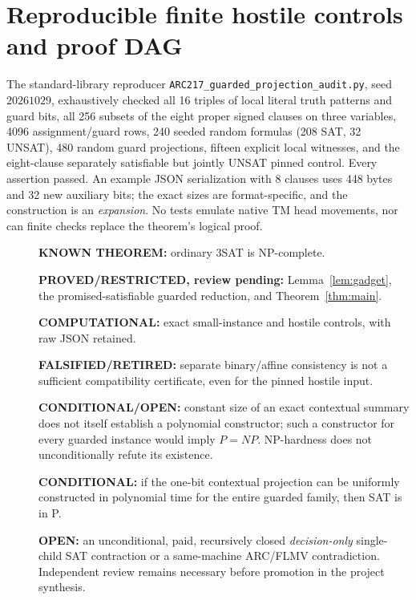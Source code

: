 \documentclass[11pt]{article}
\begin{document}
\section{Reproducible finite hostile controls and proof DAG}
The standard-library reproducer \texttt{ARC217\_guarded\_projection\_audit.py}, seed $20261029$, exhaustively checked all 16 triples of local literal truth patterns and guard bits, all 256 subsets of the eight proper signed clauses on three variables, 4096 assignment/guard rows, 240 seeded random formulas (208 SAT, 32 UNSAT), 480 random guard projections, fifteen explicit local witnesses, and the eight-clause separately satisfiable but jointly UNSAT pinned control. Every assertion passed. An example JSON serialization with 8 clauses uses 448 bytes and 32 new auxiliary bits; the exact sizes are format-specific, and the construction is an \emph{expansion}. No tests emulate native TM head movements, nor can finite checks replace the theorem's logical proof.

\begin{description}
\item[]\textbf{KNOWN THEOREM:} ordinary $3$SAT is NP-complete.
\item[]\textbf{PROVED/RESTRICTED, review pending:} Lemma~\ref{lem:gadget}, the promised-satisfiable guarded reduction, and Theorem~\ref{thm:main}.
\item[]\textbf{COMPUTATIONAL:} exact small-instance and hostile controls, with raw JSON retained.
\item[]\textbf{FALSIFIED/RETIRED:} separate binary/affine consistency is not a sufficient compatibility certificate, even for the pinned hostile input.
\item[]\textbf{CONDITIONAL/OPEN:} constant size of an exact contextual summary does not itself establish a polynomial constructor; such a constructor for every guarded instance would imply $P=NP$. NP-hardness does not unconditionally refute its existence.
\item[]\textbf{CONDITIONAL:} if the one-bit contextual projection can be uniformly constructed in polynomial time for the entire guarded family, then SAT is in P.
\item[]\textbf{OPEN:} an unconditional, paid, recursively closed \emph{decision-only} single-child SAT contraction or a same-machine ARC/FLMV contradiction. Independent review remains necessary before promotion in the project synthesis.
\end{description}
\end{document}
